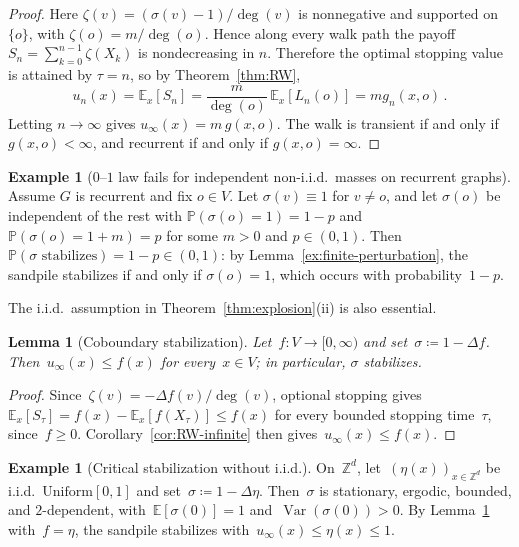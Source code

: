 \documentclass[11pt]{amsart}
\theoremstyle{plain}
\newtheorem{lemma}[theorem]{Lemma}
\theoremstyle{definition}
\newtheorem{example}[theorem]{Example}
\newcommand{\Z}{\mathbb{Z}}
\newcommand{\E}{\mathbb{E}}
\renewcommand{\P}{\mathbb{P}}
\DeclareMathOperator{\var}{Var}
\begin{document}
	\begin{proof}
		Here $\zeta(v)=(\sigma(v)-1)/\deg(v)$ is nonnegative and supported on $\{o\}$, with $\zeta(o)=m/\deg(o)$.
		Hence along every walk path the payoff $S_n=\sum_{k=0}^{n-1}\zeta(X_k)$ is nondecreasing in $n$.
		Therefore the optimal stopping value is attained by $\tau=n$, so by Theorem~\ref{thm:RW},
		\[
		u_n(x)=\E_x[S_n]=\frac{m}{\deg(o)}\,\E_x[L_n(o)]=m g_n(x,o)\,.
		\]
		Letting $n\to\infty$ gives $u_\infty(x)=m\,g(x,o)$.
		The walk is transient if and only if $g(x,o)<\infty$, and recurrent if and only if $g(x,o)=\infty$.
	\end{proof}
	
	\begin{example}[$0$--$1$ law fails for independent non-i.i.d.\ masses on recurrent graphs]\label{ex:01-fails}
		Assume $G$ is recurrent and fix $o\in V$.
		Let $\sigma(v)\equiv 1$ for $v\neq o$, and let $\sigma(o)$ be independent of the rest with
		$\P(\sigma(o)=1)=1-p$ and $\P(\sigma(o)=1+m)=p$ for some $m>0$ and $p\in(0,1)$.
		Then $\P(\sigma\text{ stabilizes})=1-p\in(0,1)$: by Lemma~\ref{ex:finite-perturbation}, the sandpile stabilizes if and only if $\sigma(o)=1$, which occurs with probability~$1-p$.
	\end{example}
	
	The i.i.d.\ assumption in Theorem~\ref{thm:explosion}(ii) is also essential.
	
	\begin{lemma}[Coboundary stabilization]\label{ex:coboundary}
		Let~$f\colon V\to[0,\infty)$ and set~$\sigma\coloneqq 1-\Delta f$. Then~$u_\infty(x)\leq f(x)$ for every~$x\in V$; in particular, $\sigma$ stabilizes.
	\end{lemma}
	
	\begin{proof}
		Since~$\zeta(v)=-\Delta f(v)/\deg(v)$, optional stopping gives~$\E_x[S_\tau]=f(x)-\E_x[f(X_\tau)]\leq f(x)$ for every bounded stopping time~$\tau$, since~$f\geq 0$.  Corollary~\ref{cor:RW-infinite} then gives~$u_\infty(x)\leq f(x)$.
	\end{proof}
	
	\begin{example}[Critical stabilization without i.i.d.]\label{ex:coboundary-Zd}
		On~$\Z^d$, let~$(\eta(x))_{x\in\Z^d}$ be i.i.d.\ $\mathrm{Uniform}[0,1]$ and set~$\sigma\coloneqq 1-\Delta\eta$.
		Then~$\sigma$ is stationary, ergodic, bounded, and $2$-dependent, with~$\E[\sigma(0)]=1$ and~$\var(\sigma(0))>0$.
		By Lemma~\ref{ex:coboundary} with~$f=\eta$, the sandpile stabilizes with~$u_\infty(x)\leq\eta(x)\leq 1$.
	\end{example}
	
\end{document}
